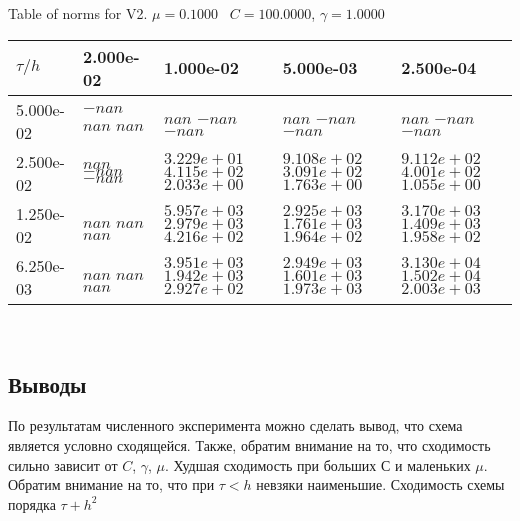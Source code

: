 \begin{center}
	Table of norms for V2. $\mu = 0.1000$ \, $C = 100.0000$, $\gamma = 1.0000$
	
	\begin{tabular}{|p{1in}|p{1in}|p{1in}|p{1in}|p{1in}|} \hline
		$\tau / h$ &2.000e-02 &1.000e-02 &5.000e-03 &2.500e-04 \\ \hline 
		5.000e-02 & $-nan$  $nan$  $nan$  & $nan$  $-nan$  $-nan$  & $nan$  $-nan$  $-nan$  & $nan$  $-nan$  $-nan$  \\ \hline 
		2.500e-02 & $nan$  $-nan$  $-nan$  & $3.229e+01$  $4.115e+02$  $2.033e+00$  & $9.108e+02$  $3.091e+02$  $1.763e+00$  & $9.112e+02$  $4.001e+02$  $1.055e+00$  \\ \hline 
		1.250e-02 & $nan$  $nan$  $nan$  & $5.957e+03$  $2.979e+03$  $4.216e+02$  & $2.925e+03$  $1.761e+03$  $1.964e+02$  & $3.170e+03$  $1.409e+03$  $1.958e+02$  \\ \hline 
		6.250e-03 & $nan$  $nan$  $nan$  & $3.951e+03$  $1.942e+03$  $2.927e+02$  & $2.949e+03$  $1.601e+03$  $1.973e+03$  & $3.130e+04$  $1.502e+04$  $2.003e+03$  \\ \hline 
		
	\end{tabular}\\[20pt]
\end{center}

\fi

\subsection {Выводы}
По результатам численного эксперимента можно сделать вывод, что схема является условно сходящейся. Также, обратим внимание на то, что сходимость сильно зависит от $C$, $\gamma$, $\mu$. Худшая сходимость при больших $С$ и маленьких $\mu$. Обратим внимание на то, что при $\tau < h$ невзяки наименьшие. Сходимость схемы порядка $\tau + h^2$

